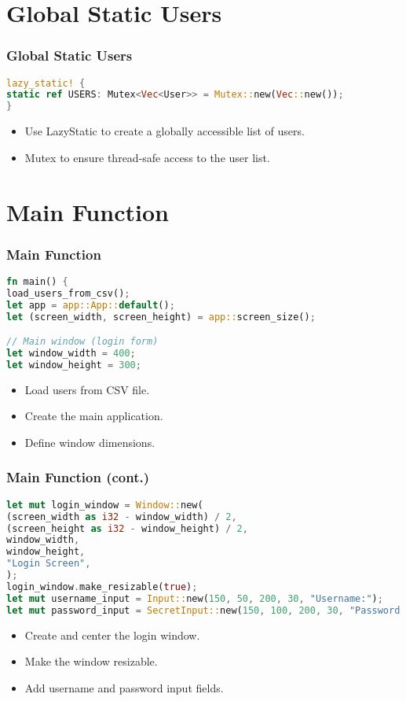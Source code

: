 \documentclass[aspectratio=169, table]{beamer}
\begin{document}
\section{Global Static Users}
\begin{frame}[fragile]
\frametitle{Global Static Users}
\begin{lstlisting}[language=Rust]
lazy_static! {
static ref USERS: Mutex<Vec<User>> = Mutex::new(Vec::new());
}
\end{lstlisting}
\begin{itemize}
\item Use LazyStatic to create a globally accessible list of users.
\item Mutex to ensure thread-safe access to the user list.
\end{itemize}
\end{frame}

\section{Main Function}
\begin{frame}[fragile]
\frametitle{Main Function}
\begin{lstlisting}[language=Rust]
fn main() {
load_users_from_csv();
let app = app::App::default();
let (screen_width, screen_height) = app::screen_size();

// Main window (login form)
let window_width = 400;
let window_height = 300;
\end{lstlisting}
\begin{itemize}
\item Load users from CSV file.
\item Create the main application.
\item Define window dimensions.
\end{itemize}
\end{frame}

\begin{frame}[fragile]
\frametitle{Main Function (cont.)}
\vspace{15pt}
\begin{lstlisting}[language=Rust]
let mut login_window = Window::new(
(screen_width as i32 - window_width) / 2,
(screen_height as i32 - window_height) / 2,
window_width,
window_height,
"Login Screen",
);
login_window.make_resizable(true);
let mut username_input = Input::new(150, 50, 200, 30, "Username:");
let mut password_input = SecretInput::new(150, 100, 200, 30, "Password:");
\end{lstlisting}
\begin{itemize}
\item Create and center the login window.
\item Make the window resizable.
\item Add username and password input fields.
\end{itemize}
\end{frame}
\end{document}
